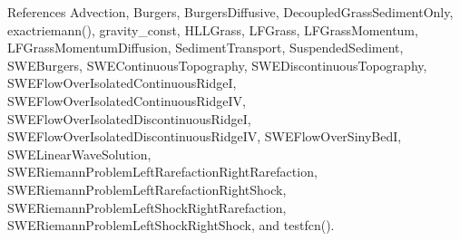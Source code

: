 References Advection, Burgers, Burgers\-Diffusive, Decoupled\-Grass\-Sediment\-Only, exactriemann(), gravity\-\_\-const, H\-L\-L\-Grass, L\-F\-Grass, L\-F\-Grass\-Momentum, L\-F\-Grass\-Momentum\-Diffusion, Sediment\-Transport, Suspended\-Sediment, S\-W\-E\-Burgers, S\-W\-E\-Continuous\-Topography, S\-W\-E\-Discontinuous\-Topography, S\-W\-E\-Flow\-Over\-Isolated\-Continuous\-Ridge\-I, S\-W\-E\-Flow\-Over\-Isolated\-Continuous\-Ridge\-I\-V, S\-W\-E\-Flow\-Over\-Isolated\-Discontinuous\-Ridge\-I, S\-W\-E\-Flow\-Over\-Isolated\-Discontinuous\-Ridge\-I\-V, S\-W\-E\-Flow\-Over\-Siny\-Bed\-I, S\-W\-E\-Linear\-Wave\-Solution, S\-W\-E\-Riemann\-Problem\-Left\-Rarefaction\-Right\-Rarefaction, S\-W\-E\-Riemann\-Problem\-Left\-Rarefaction\-Right\-Shock, S\-W\-E\-Riemann\-Problem\-Left\-Shock\-Right\-Rarefaction, S\-W\-E\-Riemann\-Problem\-Left\-Shock\-Right\-Shock, and testfcn().

